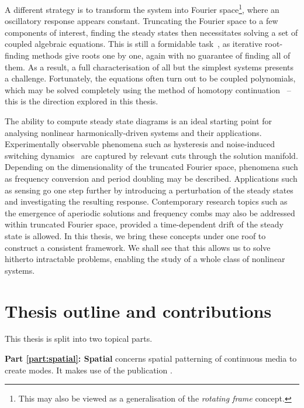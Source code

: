 A different strategy is to transform the system into Fourier space\footnote{This may also be viewed as a generalisation of the \textit{rotating frame} concept.}, where an oscillatory response appears constant. Truncating the Fourier space to a few components of interest, finding the steady states then necessitates solving a set of coupled algebraic equations. This is still a formidable task~\cite{Bernshtein1975,sturmfels2002solving,cox2005solving}, as iterative root-finding methods give roots one by one, again with no guarantee of finding all of them. As a result, a full characterisation of all but the simplest systems presents a challenge.  Fortunately, the equations often turn out to be coupled polynomials, which may be solved completely using the method of homotopy continuation~\cite{Sommese2005,Breiding_2018,timme2021numerical} -- this is the direction explored in this thesis. 

The ability to compute steady state diagrams is an ideal starting point for analysing nonlinear harmonically-driven systems and their applications. Experimentally observable phenomena such as hysteresis and noise-induced switching dynamics~\cite{Leuch_2016, Heugel_2019, Margiani2021} are captured by relevant cuts through the solution manifold. Depending on the dimensionality of the truncated Fourier space, phenomena such as frequency conversion and period doubling may be described. Applications such as sensing go one step further by introducing a perturbation of the steady states and investigating the resulting response. Contemporary research topics such as the emergence of aperiodic solutions and frequency combs may also be addressed within truncated Fourier space, provided a time-dependent drift of the steady state is allowed. In this thesis, we bring these concepts under one roof to construct a consistent framework. We shall see that this allows us to solve hitherto intractable problems, enabling the study of a whole class of nonlinear systems.


\section{Thesis outline and contributions}

This thesis is split into two topical parts. 

\textbf{Part \ref{part:spatial}: Spatial} concerns spatial patterning of continuous media to create modes. It makes use of the publication \cite{Kosata_2021}.

